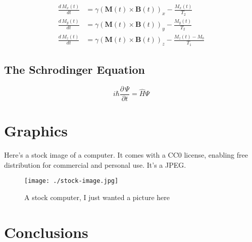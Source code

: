 \documentclass{workreport}
\begin{document}
\begin{body}
	\begin{align}
		\frac{d\, M_x(t)}{dt} &= \gamma(\mathbf{M}(t) \times \mathbf{B}(t))_x - \frac{M_x(t)}{T_2} \\
		\frac{d\, M_y(t)}{dt} &= \gamma(\mathbf{M}(t) \times \mathbf{B}(t))_y - \frac{M_y(t)}{T_2} \\
		\frac{d\, M_z(t)}{dt} &= \gamma(\mathbf{M}(t) \times \mathbf{B}(t))_z - \frac{M_z(t) - M_0}{T_1}
	\end{align}

\subsection{The Schrodinger Equation}

	\begin{equation}
		i\hbar \frac{\partial \, \Psi}{\partial t} = \hat{H}\Psi
	\end{equation}

\section{Graphics}

	Here's a stock image of a computer. It comes with a CC0 license, enabling
	free distribution for commercial and personal use. It's a JPEG.

	\begin{figure}[!ht]
		\centering
		\label{fig:stock_computer}
		\texttt{[image: ./stock-image.jpg]}
		\caption{A stock computer, I just wanted a picture here}
	\end{figure}

\section{Conclusions}


\end{body}
\end{document}
